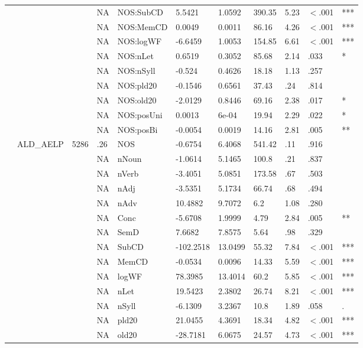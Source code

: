 \begin{table}[ht]
\begin{tabular}{lllllllllll}
   &  &  & NA & NOS:SubCD & 5.5421 & 1.0592 & 390.35 & 5.23 & $<$.001 & *** \\ 
   &  &  & NA & NOS:MemCD & 0.0049 & 0.0011 & 86.16 & 4.26 & $<$.001 & *** \\ 
   &  &  & NA & NOS:logWF & -6.6459 & 1.0053 & 154.85 & 6.61 & $<$.001 & *** \\ 
   &  &  & NA & NOS:nLet & 0.6519 & 0.3052 & 85.68 & 2.14 & .033 & * \\ 
   &  &  & NA & NOS:nSyll & -0.524 & 0.4626 & 18.18 & 1.13 & .257 &   \\ 
   &  &  & NA & NOS:pld20 & -0.1546 & 0.6561 & 37.43 & .24 & .814 &   \\ 
   &  &  & NA & NOS:old20 & -2.0129 & 0.8446 & 69.16 & 2.38 & .017 & * \\ 
   &  &  & NA & NOS:posUni & 0.0013 & 6e-04 & 19.94 & 2.29 & .022 & * \\ 
   &  &  & NA & NOS:posBi & -0.0054 & 0.0019 & 14.16 & 2.81 & .005 & ** \\ 
   & ALD\_AELP & 5286 & .26 & NOS & -0.6754 & 6.4068 & 541.42 & .11 & .916 &   \\ 
   &  &  & NA & nNoun & -1.0614 & 5.1465 & 100.8 & .21 & .837 &   \\ 
   &  &  & NA & nVerb & -3.4051 & 5.0851 & 173.58 & .67 & .503 &   \\ 
   &  &  & NA & nAdj & -3.5351 & 5.1734 & 66.74 & .68 & .494 &   \\ 
   &  &  & NA & nAdv & 10.4882 & 9.7072 & 6.2 & 1.08 & .280 &   \\ 
   &  &  & NA & Conc & -5.6708 & 1.9999 & 4.79 & 2.84 & .005 & ** \\ 
   &  &  & NA & SemD & 7.6682 & 7.8575 & 5.64 & .98 & .329 &   \\ 
   &  &  & NA & SubCD & -102.2518 & 13.0499 & 55.32 & 7.84 & $<$.001 & *** \\ 
   &  &  & NA & MemCD & -0.0534 & 0.0096 & 14.33 & 5.59 & $<$.001 & *** \\ 
   &  &  & NA & logWF & 78.3985 & 13.4014 & 60.2 & 5.85 & $<$.001 & *** \\ 
   &  &  & NA & nLet & 19.5423 & 2.3802 & 26.74 & 8.21 & $<$.001 & *** \\ 
   &  &  & NA & nSyll & -6.1309 & 3.2367 & 10.8 & 1.89 & .058 & . \\ 
   &  &  & NA & pld20 & 21.0455 & 4.3691 & 18.34 & 4.82 & $<$.001 & *** \\ 
   &  &  & NA & old20 & -28.7181 & 6.0675 & 24.57 & 4.73 & $<$.001 & *** \\ 

\end{tabular}
\end{table}
